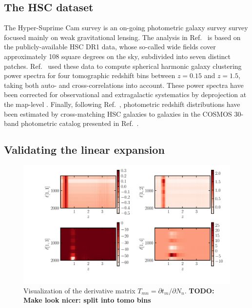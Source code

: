\documentclass[a4paper,11pt]{article}
\newcommand{\todo}[1]{{\bf TODO: #1}}
\begin{document}
\subsection{The HSC dataset}
The Hyper-Suprime Cam survey is an on-going photometric galaxy survey survey focused mainly on weak gravitational lensing. The analysis in Ref.~\cite{1912.08209} is based on the publicly-available HSC DR1 data, whose so-called wide fields cover approximately 108 square degrees on the sky, subdivided into seven distinct patches. Ref.~\cite{1912.08209} used these data to compute spherical harmonic galaxy clustering power spectra for four tomographic redshift bins between $z=0.15$ and $z=1.5$, taking both auto- and cross-correlations into account. These power spectra have been corrected for observational and extragalactic systematics by deprojection at the map-level \cite{2019MNRAS.484.4127A}. Finally, following Ref.~\cite{2019PASJ...71...43H}, photometric redshift distributions have been estimated by cross-matching HSC galaxies to galaxies in the COSMOS 30-band photometric catalog presented in Ref.~\cite{2016ApJS..224...24L}.
\subsection{Validating the linear expansion}


\begin{figure}[ht]
\centering  
\includegraphics[width=1.\textwidth]{./Tmat}
\caption{Visualization of the derivative matrix $T_{mn} = {\partial t_m}/{\partial N_n}$. \todo{Make look nicer: split into tomo bins}} 
\label{fig:Tmat}
\end{figure}
\end{document}
